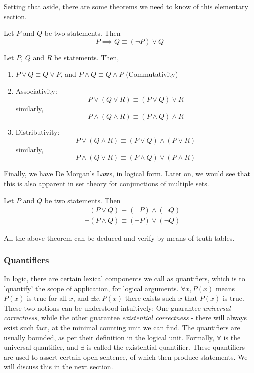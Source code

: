 Setting that aside, there are some theorems we need to know of this elementary section. 

\begin{theorem}[Equivalencing]
    Let $P$ and $Q$ be two statements. Then 
    \begin{equation*}
        P \implies Q \equiv (\lnot P) \lor Q
    \end{equation*}
\end{theorem}

\begin{theorem}
    Let $P$, $Q$ and $R$ be statements. Then, 
    \begin{enumerate}
        \item $P \lor Q \equiv Q \lor P$, and $P \land Q \equiv Q \land P$ (Commutativity)
        \item Associativity: \[P \lor (Q \lor R) \equiv (P \lor Q) \lor R\] similarly, \[P \land (Q \land R) \equiv (P \land Q) \land R\]
        \item Distributivity: \[P \lor (Q \land R) \equiv (P \lor Q)\land (P \lor R)\] similarly, \[P \land (Q \lor R) \equiv (P\land Q) \lor (P\land R)\]
    \end{enumerate}
\end{theorem}

Finally, we have De Morgan's Laws, in logical form. Later on, we would see that this is also apparent in set theory for conjunctions of multiple sets.  
\begin{theorem}[De Morgan]
    Let $P$ and $Q$ be two statements. Then
    \begin{align}
        & \lnot (P \lor Q) \equiv (\lnot P) \land (\lnot Q) \\
        & \lnot (P \land Q) \equiv (\lnot P) \lor (\lnot Q)
    \end{align}
\end{theorem}

All the above theorem can be deduced and verify by means of truth tables. 

\subsubsection{Quantifiers}

In logic, there are certain lexical components we call as quantifiers, which is to 'quantify' the scope of application, for logical arguments. $\forall x,P(x)$ means $P(x)$ is true for all $x$, and $\exists x,P(x)$ there exists such $x$ that $P(x)$ is true. These two notions can be understood intuitively: One guarantee \textit{universal correctness}, while the other guarantee \textit{existential correctness} - there will always exist such fact, at the minimal counting unit we can find. The quantifiers are usually bounded, as per their definition in the logical unit. Formally, $\forall$ is the universal quantifier, and $\exists$ is called the existential quantifier. These quantifiers are used to assert certain open sentence, of which then produce statements. We will discuss this in the next section. 

